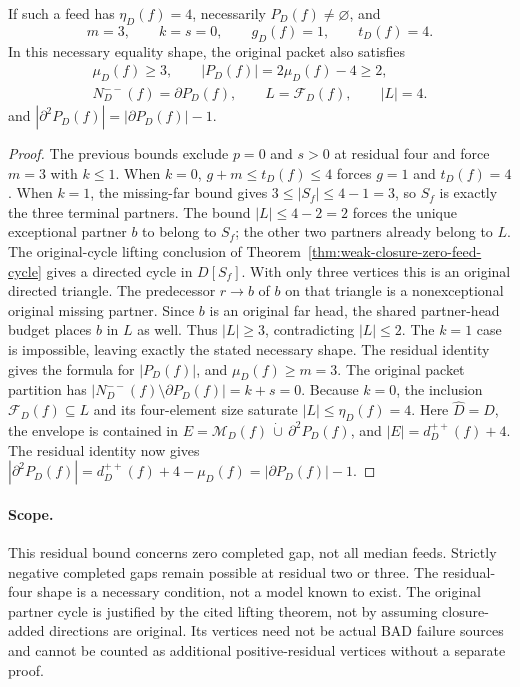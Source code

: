 \begin{corollary}
\label{cor:minimal-weak-zero-feed-residual-four-shapes}
If such a feed has $\eta_D(f)=4$, necessarily
$P_D(f)\ne\varnothing$, and
\[
 m=3,\qquad k=s=0,\qquad g_D(f)=1,\qquad t_D(f)=4.
\]
In this necessary equality shape, the original packet also satisfies
\[
 \begin{gathered}
 \mu_D(f)\ge3,\qquad |P_D(f)|=2\mu_D(f)-4\ge2,\\
 N_D^{--}(f)=\partial P_D(f),\qquad L=\mathcal F_D(f),\qquad |L|=4.
 \end{gathered}
\]
and $|\partial^2P_D(f)|=|\partial P_D(f)|-1$.
\end{corollary}
\begin{proof}
The previous bounds exclude $p=0$ and $s>0$ at residual four and force
$m=3$ with $k\le1$. When $k=0$, $g+m\le t_D(f)\le4$ forces
$g=1$ and $t_D(f)=4$. When $k=1$, the missing-far bound gives
$3\le|S_f|\le4-1=3$, so $S_f$ is exactly the three terminal partners.
The bound $|L|\le4-2=2$ forces the unique exceptional partner $b$
to belong to $S_f$; the other two partners already belong to $L$.
The original-cycle lifting conclusion of
Theorem~\ref{thm:weak-closure-zero-feed-cycle} gives a directed cycle
in $D[S_f]$. With only three vertices this is an original directed
triangle. The predecessor $r\to b$ of $b$ on that triangle is a
nonexceptional original missing partner. Since $b$ is an original
far head, the shared partner-head budget places $b$ in $L$ as well.
Thus $|L|\ge3$, contradicting $|L|\le2$. The $k=1$ case is impossible,
leaving exactly the stated necessary shape.
The residual identity gives the formula for $|P_D(f)|$, and
$\mu_D(f)\ge m=3$. The original packet partition has
$|N_D^{--}(f)\setminus\partial P_D(f)|=k+s=0$.
Because $k=0$, the inclusion $\mathcal F_D(f)\subseteq L$ and its
four-element size saturate $|L|\le\eta_D(f)=4$.
Here $\widehat D=D$, the envelope is contained in
$E=\mathcal M_D(f)\,\dot\cup\,\partial^2P_D(f)$, and
$|E|=d_D^{++}(f)+4$. The residual identity now gives
$|\partial^2P_D(f)|=d_D^{++}(f)+4-\mu_D(f)
=|\partial P_D(f)|-1$.
\end{proof}

\paragraph{Scope.}
This residual bound concerns zero completed gap, not all median feeds.
Strictly negative completed gaps remain possible at residual two or
three. The residual-four shape is a necessary condition, not a model
known to exist. The original partner cycle is justified by the cited
lifting theorem, not by assuming closure-added directions are original.
Its vertices need not be actual BAD failure sources and cannot be
counted as additional positive-residual vertices without a separate proof.

